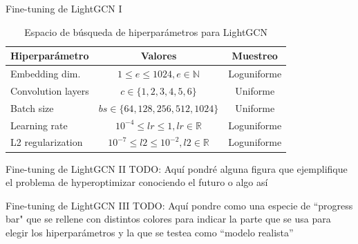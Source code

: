 \begin{frame}{Fine-tuning de LightGCN I}
\begin{table}[]
    \centering
    \begin{tabular}{l|c|c}
\textbf{Hiperparámetro} & \textbf{Valores} & \textbf{Muestreo} \\
\hline
Embedding dim. & $1\leq e\leq 1024, e\in \mathbb{N}$ & Loguniforme \\
Convolution layers & $c\in \{1,2,3,4,5,6\}$ & Uniforme \\
Batch size & $bs\in\{64,128,256,512,1024\}$ & Uniforme \\
Learning rate & $10^{-4}\leq lr\leq 1, lr\in \mathbb{R}$ & Loguniforme \\
L2 regularization & $10^{-7}\leq l2 \leq 10^{-2}, l2 \in \mathbb{R}$ & Loguniforme \\
    \end{tabular}
    \caption{Espacio de búsqueda de hiperparámetros para LightGCN}
\end{table}
\end{frame}

\begin{frame}{Fine-tuning de LightGCN II}
    TODO: Aquí pondré alguna figura que ejemplifique el problema de hyperoptimizar conociendo el futuro o algo así
\end{frame}

\begin{frame}{Fine-tuning de LightGCN III}
    TODO: Aquí pondre como una especie de ``progress bar" que se rellene con distintos colores para indicar la parte que se usa para elegir los hiperparámetros y la que se testea como ``modelo realista''
\end{frame}

